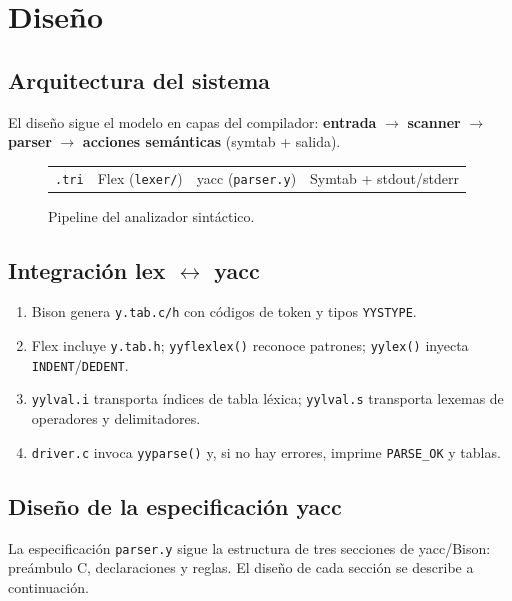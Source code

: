 \section{Diseño}

\subsection{Arquitectura del sistema}
El diseño sigue el modelo en capas del compilador: \textbf{entrada} $\rightarrow$ \textbf{scanner} $\rightarrow$ \textbf{parser} $\rightarrow$ \textbf{acciones semánticas} (symtab + salida).

\begin{figure}[H]
\centering
\begin{tabular}{@{}c@{\,$\rightarrow$\,}c@{\,$\rightarrow$\,}c@{\,$\rightarrow$\,}c@{}}
\texttt{.tri} & Flex (\texttt{lexer/}) & yacc (\texttt{parser.y}) & Symtab + stdout/stderr \\
\end{tabular}
\caption{Pipeline del analizador sintáctico.}
\label{fig:pipeline}
\end{figure}

\subsection{Integración lex $\leftrightarrow$ yacc}
\begin{enumerate}
  \item Bison genera \texttt{y.tab.c/h} con códigos de token y tipos \texttt{YYSTYPE}.
  \item Flex incluye \texttt{y.tab.h}; \texttt{yyflexlex()} reconoce patrones; \texttt{yylex()} inyecta \texttt{INDENT}/\texttt{DEDENT}.
  \item \texttt{yylval.i} transporta índices de tabla léxica; \texttt{yylval.s} transporta lexemas de operadores y delimitadores.
  \item \texttt{driver.c} invoca \texttt{yyparse()} y, si no hay errores, imprime \texttt{PARSE\_OK} y tablas.
\end{enumerate}

\subsection{Diseño de la especificación yacc}
\label{sec:diseno_yacc}

La especificación \texttt{parser.y} sigue la estructura de tres secciones de
yacc/Bison: preámbulo C, declaraciones y reglas. El diseño de cada sección se
describe a continuación.

